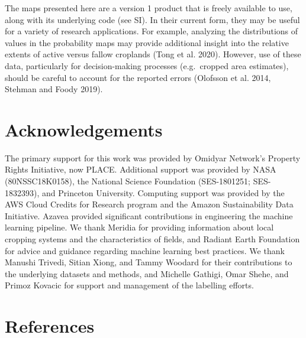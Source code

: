\documentclass[11pt,a4paper]{article}
\begin{document}
The maps presented here are a version 1 product that is freely available
to use, along with its underlying code (see SI). In their current form,
they may be useful for a variety of research applications. For example,
analyzing the distributions of values in the probability maps may
provide additional insight into the relative extents of active versus
fallow croplands (Tong et al. 2020). However, use of these data,
particularly for decision-making processes (e.g.~cropped area
estimates), should be careful to account for the reported errors
(Olofsson et al. 2014, Stehman and Foody 2019).

\hypertarget{acknowledgements}{%
\section{Acknowledgements}\label{acknowledgements}}

The primary support for this work was provided by Omidyar Network's
Property Rights Initiative, now PLACE. Additional support was provided
by NASA (80NSSC18K0158), the National Science Foundation (SES-1801251;
SES-1832393), and Princeton University. Computing support was provided
by the AWS Cloud Credits for Research program and the Amazon
Sustainability Data Initiative. Azavea provided significant
contributions in engineering the machine learning pipeline. We thank
Meridia for providing information about local cropping systems and the
characteristics of fields, and Radiant Earth Foundation for advice and
guidance regarding machine learning best practices. We thank Manushi
Trivedi, Sitian Xiong, and Tammy Woodard for their contributions to the
underlying datasets and methods, and Michelle Gathigi, Omar Shehe, and
Primoz Kovacic for support and management of the labelling efforts.

\hypertarget{references}{%
\section{References}\label{references}}

\singlespace
\end{document}
